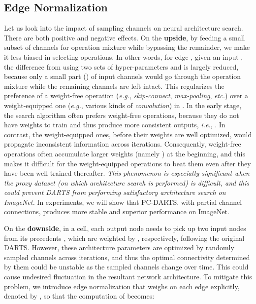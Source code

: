 \documentclass{article} \usepackage{iclr2020_conference,times}
\begin{document}
\subsection{Edge Normalization}
\label{Approach:EdgeNormalization}

Let us look into the impact of sampling channels on neural architecture search. There are both positive and negative effects. On the \textbf{upside}, by feeding a small subset of channels for operation mixture while bypassing the remainder, we make it less biased in selecting operations. In other words, for edge , given an input , the difference from using two sets of hyper-parameters  and  is largely reduced, because only a small part () of input channels would go through the operation mixture while the remaining channels are left intact. This regularizes the preference of a weight-free operation (\textit{e.g.}, \textit{skip-connect}, \textit{max-pooling}, \textit{etc.}) over a weight-equipped one (\textit{e.g.}, various kinds of \textit{convolution}) in . In the early stage, the search algorithm often prefers weight-free operations, because they do not have weights to train and thus produce more consistent outputs, \textit{i.e.}, . In contrast, the weight-equipped ones, before their weights are well optimized, would propagate inconsistent information across iterations. Consequently, weight-free operations often accumulate larger weights (namely ) at the beginning, and this makes it difficult for the weight-equipped operations to beat them even after they have been well trained thereafter. \textit{This phenomenon is especially significant when the proxy dataset (on which architecture search is performed) is difficult, and this could prevent DARTS from performing satisfactory architecture search on ImageNet.} In experiments, we will show that PC-DARTS, with partial channel connections, produces more stable and superior performance on ImageNet.

On the \textbf{downside}, in a cell, each output node  needs to pick up two input nodes from its precedents , which are weighted by , respectively, following the original DARTS. However, these architecture parameters are optimized by randomly sampled channels across iterations, and thus the optimal connectivity determined by them could be unstable as the sampled channels change over time. This could cause undesired fluctuation in the resultant network architecture. To mitigate this problem, we introduce edge normalization that weighs on each edge  explicitly, denoted by , so that the computation of  becomes:
\end{document}
